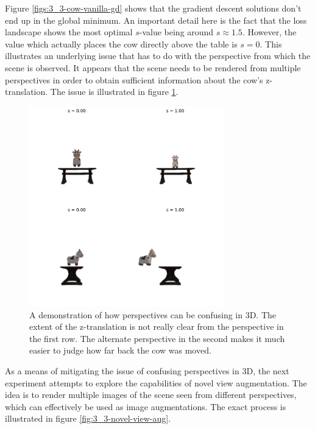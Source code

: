 Figure \ref{figs:3_3-cow-vanilla-gd} shows that the gradient descent solutions don't end up in the global minimum. An important detail here is the fact that the loss landscape shows the most optimal $s$-value being around $s\approx1.5$. However, the value which actually places the cow directly above the table is $s=0$. This illustrates an underlying issue that has to do with the perspective from which the scene is observed. It appears that the scene needs to be rendered from multiple perspectives in order to obtain sufficient information about the cow's z-translation. The issue is illustrated in figure \ref{fig:3_3-cow-perspectives}.

\begin{figure}[H]
    \centering
    \includegraphics[width=0.75\textwidth]{figures/3_3-cow-perspectives.pdf}
    \caption{A demonstration of how perspectives can be confusing in 3D. The extent of the z-translation is not really clear from the perspective in the first row. The alternate perspective in the second makes it much easier to judge how far back the cow was moved.}
    \label{fig:3_3-cow-perspectives}
\end{figure}


As a means of mitigating the issue of confusing perspectives in 3D, the next experiment attempts to explore the capabilities of novel view augmentation. The idea is to render multiple images of the scene seen from different perspectives, which can effectively be used as image augmentations. The exact process is illustrated in figure \ref{fig:3_3-novel-view-aug}.


